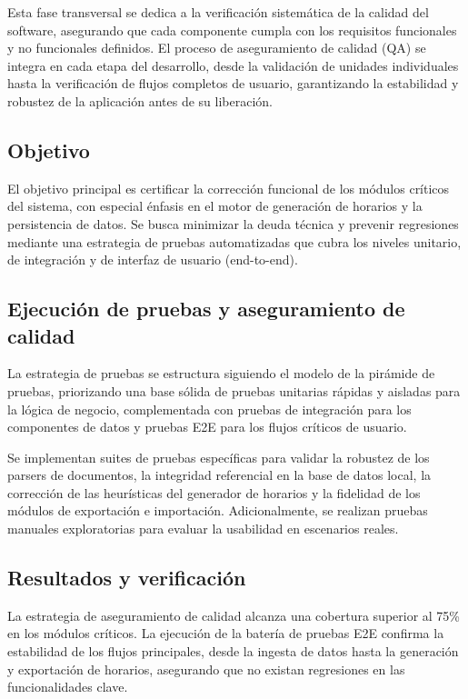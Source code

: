 Esta fase transversal se dedica a la verificación sistemática de la calidad del software, asegurando que cada componente cumpla con los requisitos funcionales y no funcionales definidos. El proceso de aseguramiento de calidad (QA) se integra en cada etapa del desarrollo, desde la validación de unidades individuales hasta la verificación de flujos completos de usuario, garantizando la estabilidad y robustez de la aplicación antes de su liberación.

\subsection{Objetivo}
El objetivo principal es certificar la corrección funcional de los módulos críticos del sistema, con especial énfasis en el motor de generación de horarios y la persistencia de datos. Se busca minimizar la deuda técnica y prevenir regresiones mediante una estrategia de pruebas automatizadas que cubra los niveles unitario, de integración y de interfaz de usuario (end-to-end).

\subsection{Ejecución de pruebas y aseguramiento de calidad}
La estrategia de pruebas se estructura siguiendo el modelo de la pirámide de pruebas, priorizando una base sólida de pruebas unitarias rápidas y aisladas para la lógica de negocio, complementada con pruebas de integración para los componentes de datos y pruebas E2E para los flujos críticos de usuario.

Se implementan suites de pruebas específicas para validar la robustez de los parsers de documentos, la integridad referencial en la base de datos local, la corrección de las heurísticas del generador de horarios y la fidelidad de los módulos de exportación e importación. Adicionalmente, se realizan pruebas manuales exploratorias para evaluar la usabilidad en escenarios reales.

\subsection{Resultados y verificación}
La estrategia de aseguramiento de calidad alcanza una cobertura superior al 75\% en los módulos críticos. La ejecución de la batería de pruebas E2E confirma la estabilidad de los flujos principales, desde la ingesta de datos hasta la generación y exportación de horarios, asegurando que no existan regresiones en las funcionalidades clave.
